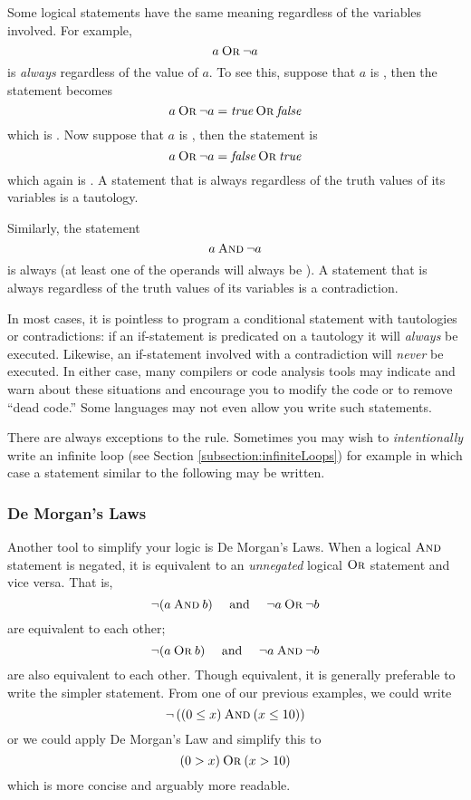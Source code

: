 Some logical statements have the same meaning regardless of the
variables involved.  For example, 
  $$a \mathbin{\textsc{Or}} \neg a$$
is \emph{always} \True regardless of the value of $a$.  To see this, suppose that
$a$ is \True, then the statement becomes
  $$a \mathbin{\textsc{Or}} \neg a = \emph{true} \mathbin{\textsc{Or}} \emph{false}$$
which is \True.  Now suppose that $a$ is \False, then the statement is 
  $$a \mathbin{\textsc{Or}} \neg a = \emph{false} \mathbin{\textsc{Or}} \emph{true}$$
which again is \True.  A statement that is always \True regardless of the truth
values of its variables is a \gls{tautology}.

Similarly, the statement
  $$a \mathbin{\textsc{And}} \neg a$$
is always \False (at least one of the operands will always be \False).  A
statement that is always \False regardless of the truth values of its variables
is a \gls{contradiction}.

In most cases, it is pointless to program a conditional statement with 
tautologies or contradictions: if an if-statement is predicated on a tautology
it will \emph{always} be executed.  Likewise, an if-statement involved with 
a contradiction will \emph{never} be executed.  In either case, many compilers
or code analysis tools may indicate and warn about these situations and 
encourage you to modify the code or to remove ``\gls{dead code}.''  Some
languages may not even allow you write such statements.

There are always exceptions to the rule.  Sometimes you may wish to 
\emph{intentionally} write an infinite loop (see Section \ref{subsection:infiniteLoops}) 
for example in which case a statement similar to the following may be written.

\begin{algorithm}[H]
\end{algorithm}

\subsubsection{De Morgan's Laws}

Another tool to simplify your logic is De Morgan's Laws.  When a logical $\mathbin{\textsc{And}}$
statement is negated, it is equivalent to an \emph{unnegated} logical $\mathbin{\textsc{Or}}$ statement
and vice versa.  That is, 
  $$\neg (a \mathbin{\textsc{And}} b) \quad \textrm{ and } \quad \neg a \mathbin{\textsc{Or}} \neg b$$
are equivalent to each other;  
  $$\neg (a \mathbin{\textsc{Or}} b) \quad \textrm{ and } \quad \neg a \mathbin{\textsc{And}} \neg b$$
are also equivalent to each other.  Though equivalent, it is generally preferable to
write the simpler statement.  From one of our previous examples, we could write
  $$\neg \left( (0 \leq x) \mathbin{\textsc{And}} (x \leq 10) \right)$$
or we could apply De Morgan's Law and simplify this to
  $$(0 > x) \mathbin{\textsc{Or}} (x > 10)$$
which is more concise and arguably more readable.

